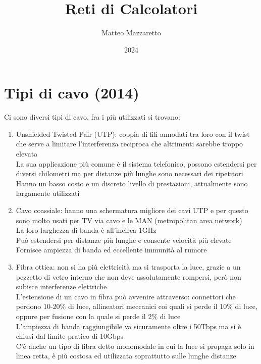 \documentclass[10pt,oneside,a4paper]{article}
\title{Reti di Calcolatori}
\author{Matteo Mazzaretto}
\date{2024}
\begin{document}
\maketitle
\begin{center}
\renewcommand{\contentsname}{Indice}
\tableofcontents
\end{center}
\newpage
\setcounter{page}{1}
\section{Tipi di cavo (2014)}
Ci sono diversi tipi di cavo, fra i più utilizzati si trovano:\\
\begin{enumerate}
\item Unshielded Twisted Pair (UTP): coppia di fili annodati tra loro con il twist che serve a limitare l'interferenza reciproca che altrimenti sarebbe troppo elevata\\
La sua applicazione più comune è il sistema telefonico, possono estendersi per diversi chilometri ma per distanze più lunghe sono necessari dei ripetitori\\
Hanno un basso costo e un discreto livello di prestazioni, attualmente sono largamente utilizzati
\item Cavo coassiale: hanno una schermatura migliore dei cavi UTP e per questo sono molto usati per TV via cavo e le MAN (metropolitan area network)\\
La loro larghezza di banda è all'incirca 1GHz\\
Può estendersi per distanze più lunghe e consente velocità più elevate\\
Fornisce ampiezza di banda ed eccellente immunità al rumore
\item Fibra ottica: non si ha più elettricità ma si trasporta la luce, grazie a un pezzetto di vetro interno che non deve assolutamente rompersi, però non subisce interferenze elettriche\\
L'estensione di un cavo in fibra può avvenire attraverso: connettori che perdono 10-20$\%$ di luce, allineatori meccanici coi quali si perde il 10$\%$ di luce, oppure per fusione con la quale si perde il 2$\%$ di luce\\
L'ampiezza di banda raggiungibile va sicuramente oltre i 50Tbps ma si è chiusi dal limite pratico di 10Gbps\\
C'è anche un tipo di fibra detto monomodale in cui la luce si propaga solo in linea retta, è più costosa ed utilizzata soprattutto sulle lunghe distanze
\end{enumerate}
\end{document}
